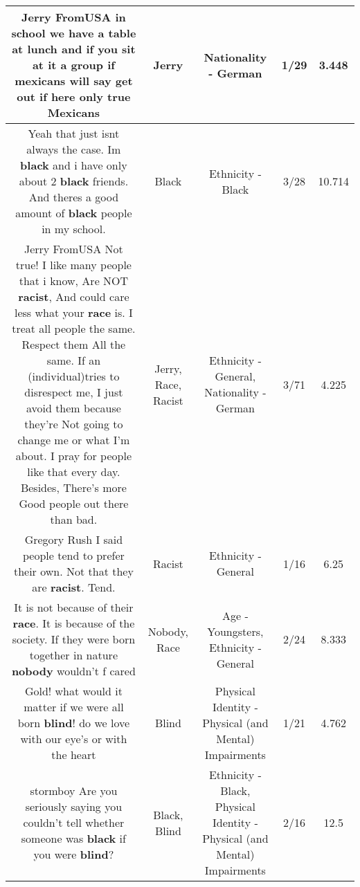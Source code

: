 \documentclass[11pt]{article}
\newlength\mylength
\begin{document}
\begin{center}
\begin{longtable}{|C{.65\mylength}|C{.30\mylength}|C{.12\mylength}|C{.12\mylength}|C{.12\mylength}|}
  \small Jerry FromUSA in school we have a table at lunch and if you sit at it a group if mexicans will say get out if here only true Mexicans\normalsize   & Jerry & Nationality - German & 1/29 & 3.448 \\  \hline
  \small Yeah that just isnt always the case. Im \textbf{black} and i have only about 2 \textbf{black} friends. And theres a good amount of \textbf{black} people in my school.\normalsize   & Black & Ethnicity - Black & 3/28 & 10.714 \\  \hline
  \small Jerry FromUSA Not true! I like many people that i know, Are NOT \textbf{racist}, And could care less what your \textbf{race} is. I treat all people the same. Respect them All the same. If an (individual)tries to disrespect me, I just avoid them because they're Not going to change me or what I'm about. I pray for people like that every day. Besides,  There's more Good people out there than bad.\normalsize   & Jerry, Race, Racist & Ethnicity - General, Nationality - German & 3/71 & 4.225 \\  \hline
  \small Gregory Rush I said people tend to prefer their own. Not that they are \textbf{racist}.  Tend.\normalsize   & Racist & Ethnicity - General & 1/16 & 6.25 \\  \hline
  \small It is not because of their \textbf{race}. It is because of the society. If they were born together in nature \textbf{nobody} wouldn't f cared\normalsize   & Nobody, Race & Age - Youngsters, Ethnicity - General & 2/24 & 8.333 \\  \hline
  \small Gold! what would it matter if we were all born \textbf{blind}! do we love with our eye's or with the heart\normalsize   & Blind & Physical Identity - Physical (and Mental) Impairments & 1/21 & 4.762 \\  \hline
  \small stormboy Are you seriously saying you couldn't tell whether someone was \textbf{black} if you were \textbf{blind}?\normalsize   & Black, Blind & Ethnicity - Black, Physical Identity - Physical (and Mental) Impairments & 2/16 & 12.5 \\  \hline

\end{longtable}
\end{center}
\end{document}
